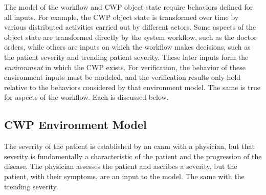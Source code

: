The model of the workflow and CWP object state require behaviors defined for all inputs.
For example, the CWP object state is transformed over time by various distributed activities carried out by different actors.
Some aspects of the object state are transformed directly by the system workflow, such as the doctor orders, while others are inputs on which the workflow makes decisions, such as the patient severity and trending patient severity. These later inputs form the \emph{environment} in which the CWP exists.
For verification, the behavior of these environment inputs must be modeled, and the verification results only hold relative to the behaviors considered by that environment model.
The same is true for aspects of the workflow. Each is discussed below.

\subsection{CWP Environment Model}
The severity of the patient is established by an exam with a physician, but that severity is fundamentally a characteristic of the patient and the progression of the disease.
The physician assesses the patient and ascribes a severity, but the patient, with their symptoms, are an input to the model.
The same with the trending severity.

\begin{comment}
There is, of course, a causal relationship between the decisions in a workflow and the resulting subsequent input.
For example, it is normally expected that when a doctor orders a patient admitted to the hospital that at some point in the future the severity rating for the patient diminishes due to the increased level of intervention and care.
Here is where modeling choices can limit the impact, and meaning, of any verification results as the verification only hold for the modeled input behavior.

The intent is to create the weakest (e.g., the least restrictive) environment model possible in which a workflow is able to be verified.
That means the environment model includes behavior that exists in the real world, and it includes behaviors that do not exist in the real world resulting in a \emph{sound over-approximation} of feasible environment behavior.
If a workflow verifies in the sound over-approximated environment, then by implication, that verification result holds in the real world since those behaviors are a subset of the ones considered for verification.
\end{comment}

